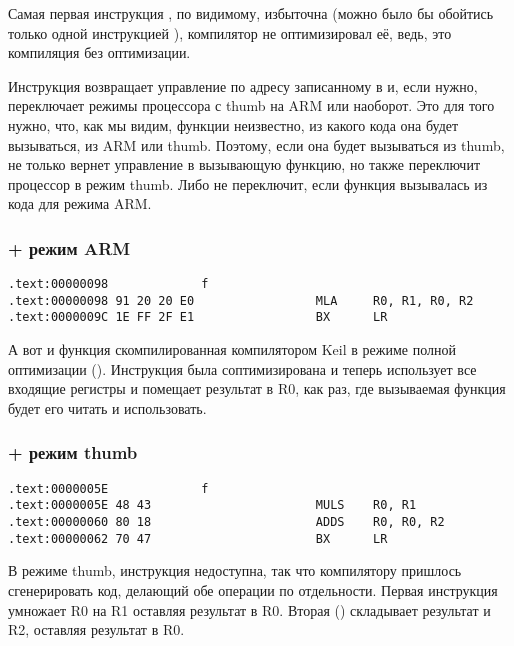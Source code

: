 Самая первая инструкция , по видимому, избыточна (можно было бы обойтись только одной инструкцией 
), компилятор не оптимизировал её, ведь, это компиляция без оптимизации.

Инструкция  возвращает управление по адресу записанному в \LR и, если нужно, переключает режимы процессора
с thumb на ARM или наоборот. Это для того нужно, что, как мы видим, функции  неизвестно, из какого кода
она будет вызываться, из ARM или thumb. Поэтому, если она будет вызываться из thumb,  не только вернет
управление в вызывающую функцию, но также переключит процессор в режим thumb. Либо не переключит, если функция
вызывалась из кода для режима ARM.

\subsubsection{\OptimizingKeil + режим ARM}

\begin{lstlisting}
.text:00000098             f
.text:00000098 91 20 20 E0                 MLA     R0, R1, R0, R2
.text:0000009C 1E FF 2F E1                 BX      LR
\end{lstlisting}

А вот и функция  скомпилированная компилятором Keil в режиме полной оптимизации (\Othree). Инструкция \MOV была
соптимизирована и теперь  использует все входящие регистры и помещает результат в R0, как раз, где
вызываемая функция будет его читать и использовать.

\subsubsection{\OptimizingKeil + режим thumb}

\begin{lstlisting}
.text:0000005E             f
.text:0000005E 48 43                       MULS    R0, R1
.text:00000060 80 18                       ADDS    R0, R0, R2
.text:00000062 70 47                       BX      LR
\end{lstlisting}

В режиме thumb, инструкция  недоступна, так что компилятору пришлось сгенерировать код, делающий
обе операции по отдельности. Первая инструкция  умножает R0 на R1 оставляя результат в R0. 
Вторая () складывает результат и R2, оставляя результат в R0.


